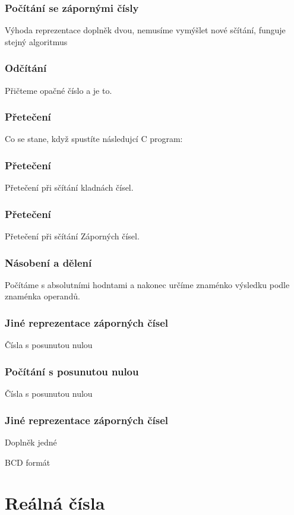 \documentclass{beamer}
\begin{document}
\begin{frame}
\frametitle{Počítání se zápornými čísly}

Výhoda reprezentace doplněk dvou, nemusíme vymýšlet nové sčítání, funguje stejný algoritmus
\end{frame}

\begin{frame}
\frametitle{Odčítání}

Přičteme opačné číslo a je to.
\end{frame}

\begin{frame}
\frametitle{Přetečení}

Co se stane, když spustíte následujcí C program:

\end{frame}

\begin{frame}
\frametitle{Přetečení}

Přetečení při sčítání kladnách čísel.
\end{frame}

\begin{frame}
\frametitle{Přetečení}

Přetečení při sčítání Záporných čísel.
\end{frame}

\begin{frame}
\frametitle{Násobení a dělení}

Počítáme s absolutními hodntami a nakonec určíme znaménko výsledku podle znaménka operandů.
\end{frame}

\begin{frame}
\frametitle{Jiné reprezentace záporných čísel}

Čísla s posunutou nulou
\end{frame}

\begin{frame}
\frametitle{Počítání s posunutou nulou}

Čísla s posunutou nulou
\end{frame}


\begin{frame}
\frametitle{Jiné reprezentace záporných čísel}

Doplněk jedné

BCD formát
\end{frame}


\section{Reálná čísla}
\end{document}
